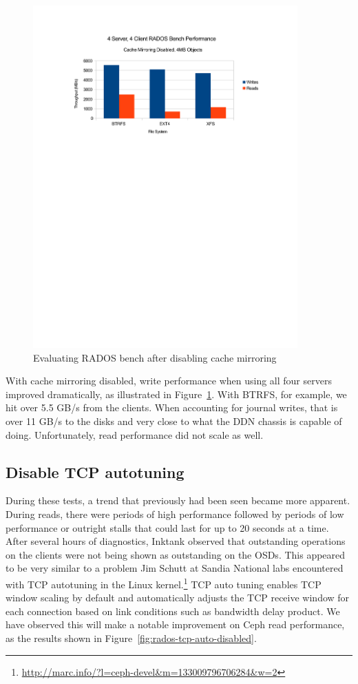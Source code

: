 \documentclass{article}
\begin{document}

\begin{figure}[htb]
\centering
\includegraphics[width=4in]{rados-after-ddn}
\caption{Evaluating RADOS bench after disabling cache mirroring}
\label{fig:rados-ddn-mirror-disabled}
\end{figure}


With cache mirroring disabled, write performance when using all four servers
improved dramatically, as illustrated in
Figure~\ref{fig:rados-ddn-mirror-disabled}. With BTRFS, for example, we hit over
5.5 GB/s from the clients.  When accounting for journal writes, that is over
11 GB/s to the disks and very close to what the DDN chassis is capable of doing. 
Unfortunately, read performance did not scale as well.


\subsection{Disable TCP autotuning}

During these tests, a trend that previously had been seen became more apparent.
During reads, there were periods of high performance followed by periods of low
performance or outright stalls that could last for up to 20 seconds at a time.
After several hours of diagnostics, Inktank observed that outstanding operations
on the clients were not being shown as outstanding on the OSDs.  This appeared
to be very similar to a problem Jim Schutt at Sandia National labs encountered
with TCP autotuning in the Linux
kernel.\footnote{\url{http://marc.info/?l=ceph-devel&m=133009796706284&w=2}} TCP auto tuning enables TCP window scaling by default and automatically adjusts
the TCP receive window for each connection based on link conditions such as
bandwidth delay product. We have observed this will make a notable improvement
on Ceph read performance, as the results shown in
Figure~\ref{fig:rados-tcp-auto-disabled}.
\end{document}
